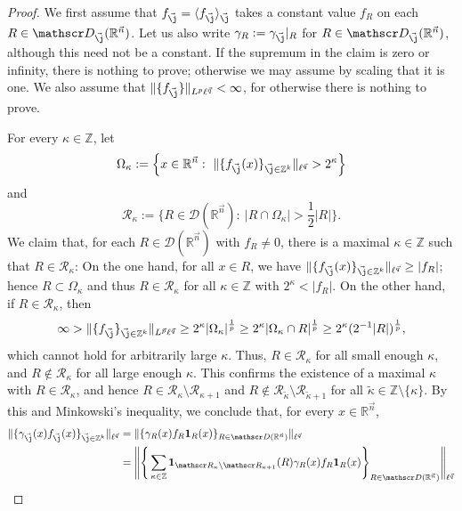 \documentclass[10pt,a4paper]{amsart}
\newcommand{\Avee}[2]{\langle#1\rangle_{#2}}
\newcommand{\D}{\mathscr D}
\newcommand{\Norm}[2]{\|#1\|_{#2}}
\newcommand{\Rs}{\mathscr R}
\newcommand{\R}{\mathbb R}
\newcommand{\Z}{\mathbb Z}
\newcommand{\abs}[1]{|#1|}
\newcommand{\one}{\mathbf{1}}
\newcommand{\vj}{\vec{\textit{\j}}}
\newcommand{\vn}{\vec n}
\newcommand{\vp}{\vec p}
\newcommand{\vq}{\vec q}
\begin{document}
\begin{proof}
We first assume that $f_{\vj}=\Avee{f_{\vj}}{\vj}$ takes a constant value $f_R$ on each $R\in\D_{\vj}(\R^{\vn})$. Let us also write $\gamma_R:=\gamma_{\vj}|_R$ for $R\in\D_{\vj}(\R^{\vn})$, although this need not be a constant. If the supremum in the claim is zero or infinity, there is nothing to prove; otherwise we may assume by scaling that it is one. We also assume that $\Norm{\{ f_{\vj}\}}{L^p\ell^{\vq}}<\infty$, for otherwise there is nothing to prove.

For every $\kappa\in\Z$, let
\begin{equation*}
\Omega_\kappa:=\Big\{x\in\R^{\vn}:\
\Norm{\{f_{\vj}(x)\}_{\vj\in\mathbb Z^k}}{\ell^{\vq}}>2^\kappa\Big\}
\end{equation*}
and
\begin{equation*}
\Rs_\kappa:=\Big\{R\in\D(\R^{\vn}):\
\abs{R\cap\Omega_\kappa}>\frac12\abs{R}\Big\}.
\end{equation*}
We claim that, for each $R\in\mathscr D(\R^{\vn})$ with $f_R\neq 0$, there is a maximal $\kappa\in\Z$ such that $R\in\Rs_\kappa$: On the one hand, for all $x\in R$, we have $\Norm{\{f_{\vj}(x)\}_{\vj\in\mathbb Z^k}}{\ell^{\vq}}\geq\abs{f_R}$; hence $R\subset\Omega_\kappa$ and thus $R\in\Rs_\kappa$ for all $\kappa\in\mathbb Z$ with $2^\kappa<\abs{f_R}$. On the other hand,
if $R\in\Rs_\kappa$, then
\begin{equation*}
\infty>\Norm{\{f_{\vj}\}_{\vj\in\mathbb Z^k}}{L^{\vp}\ell^{\vq}}
\geq 2^\kappa\abs{\Omega_\kappa}^{\frac 1p}
\geq 2^\kappa\abs{\Omega_\kappa\cap R}^{\frac 1p}
\geq 2^\kappa(2^{-1}\abs{R})^{\frac 1p},
\end{equation*}
which cannot hold for arbitrarily large $\kappa$.
Thus, $R\in\Rs_\kappa$ for all small enough $\kappa$, and $R\notin\Rs_\kappa$ for all large enough $\kappa$. This confirms the existence of a maximal $\kappa$ with $R\in\Rs_\kappa$, and hence $R\in\Rs_\kappa\setminus\Rs_{\kappa+1}$
and $R\notin\Rs_{\widetilde\kappa}\setminus\Rs_{\widetilde\kappa+1}$
for all $\widetilde\kappa\in\mathbb Z\setminus\{\kappa\}$.
By this and Minkowski's inequality, we conclude that,
for every $x\in\mathbb R^{\vec n}$,
\begin{align*}
\Norm{\{\gamma_{\vj}(x)f_{\vj}(x)\}_{\vj\in\mathbb Z^k}}{\ell^{\vq}}
&=\Norm{\{\gamma_{R}(x)f_{R}\one_R(x)\}_{R\in\D(\R^{\vn})}}{\ell^{\vq}} \\
&=\Bigg\|\Bigg\{\sum_{\kappa\in\Z}\one_{\Rs_\kappa\setminus\Rs_{\kappa+1}}(R)
\gamma_{R}(x)f_{R}\one_R(x)\Bigg\}_{R\in\D(\R^{\vn})} \Bigg\|_{\ell^{\vq}} \\

\end{align*}
\end{proof}
\end{document}
